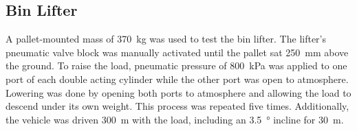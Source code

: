 \documentclass[preprint,authoryear,12pt]{elsarticle}
\begin{document}







  \subsection{Bin Lifter}

    A pallet-mounted mass of \SI{370}{\kilo\gram} was used to test the bin lifter.
    The lifter's pneumatic valve block was manually activated until the pallet sat \SI{250}{\milli\meter} above the ground.
    To raise the load, pneumatic pressure of \SI{800}{\kilo\pascal} was applied to one port of each double acting cylinder while the other port was open to atmosphere.
    Lowering was done by opening both ports to atmosphere and allowing the load to descend under its own weight.
    This process was repeated five times.
    Additionally, the vehicle was driven \SI{300}{\meter} with the load, including an \SI{3.5}{\degree} incline for \SI{30}{\meter}.
\end{document}
